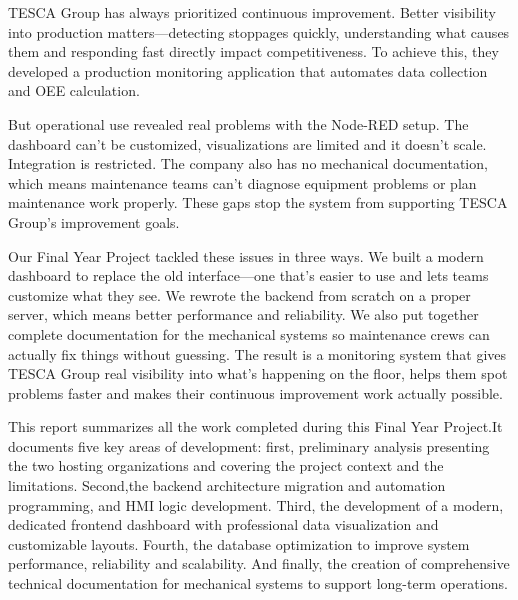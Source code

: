 \hspace*{0.25cm}TESCA Group has always prioritized continuous 
improvement. Better visibility into production
matters—detecting stoppages quickly, 
understanding what causes them and responding 
fast directly impact competitiveness. To achieve 
this, they developed a production monitoring 
application that automates data collection 
and OEE calculation.

\par\vspace{0.3cm}


\hspace*{0.25cm}But operational use revealed real problems
with the Node-RED setup. The dashboard can't 
be customized, visualizations are limited and 
it doesn't scale. Integration is restricted. 
The company also has no mechanical 
documentation, which means maintenance teams 
can't diagnose equipment problems or plan 
maintenance work properly. These gaps stop 
the system from supporting TESCA Group's 
improvement goals.

\par\vspace{0.3cm}


\hspace*{0.25cm}Our Final Year Project tackled these issues 
in three ways. We built a modern dashboard 
to replace the old interface—one that's easier 
to use and lets teams customize what they see. 
We rewrote the backend from scratch on a proper 
server, which means better performance and 
reliability. We also put together complete 
documentation for the mechanical 
systems so maintenance crews can actually fix 
things without guessing. The result is a 
monitoring system that gives TESCA Group 
real visibility into what's happening on 
the floor, helps them spot problems faster
and makes their continuous improvement work 
actually possible.

\par\vspace{0.3cm}

\hspace*{0.25cm}This report summarizes all the work 
completed during this Final Year Project.It documents five key areas of 
development: first, preliminary analysis 
presenting the two hosting organizations 
and covering the project context and the 
limitations. Second,the backend 
architecture migration and automation 
programming, and HMI logic development. Third, the development 
of a modern, dedicated frontend dashboard 
with professional data visualization and 
customizable layouts. 
Fourth, the database optimization to 
improve system performance, reliability 
and scalability. And finally, the creation 
of comprehensive 
technical documentation for mechanical 
systems to support long-term 
operations.

